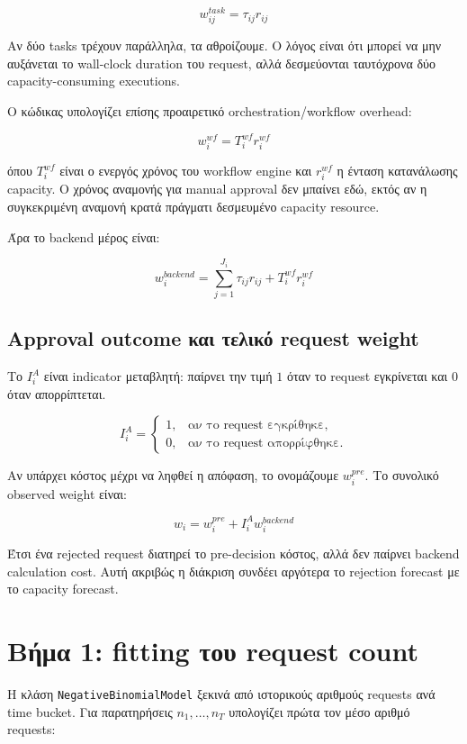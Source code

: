 \documentclass[11pt,a4paper]{article}
\newcommand{\equationnote}[1]{
  \begin{center}
    \colorbox{boxblue}{\parbox{0.92\linewidth}{\begin{equation*}#1\end{equation*}}}
  \end{center}
}
\newcommand{\code}[1]{\texttt{#1}}
\begin{document}
\equationnote{w_{ij}^{task} = \tau_{ij} r_{ij}}

Αν δύο tasks τρέχουν παράλληλα, τα αθροίζουμε. Ο λόγος είναι ότι μπορεί να
μην αυξάνεται το wall-clock duration του request, αλλά δεσμεύονται ταυτόχρονα
δύο capacity-consuming executions.

Ο κώδικας υπολογίζει επίσης προαιρετικό orchestration/workflow overhead:

\equationnote{w_i^{wf} = T_i^{wf} r_i^{wf}}

όπου $T_i^{wf}$ είναι ο ενεργός χρόνος του workflow engine και $r_i^{wf}$ η
ένταση κατανάλωσης capacity. Ο χρόνος αναμονής για manual approval δεν
μπαίνει εδώ, εκτός αν η συγκεκριμένη αναμονή κρατά πράγματι δεσμευμένο
capacity resource.

Άρα το backend μέρος είναι:

\equationnote{
  w_i^{backend} = \sum_{j=1}^{J_i} \tau_{ij}r_{ij} + T_i^{wf}r_i^{wf}
}

\subsection{Approval outcome και τελικό request weight}

Το $I_i^{A}$ είναι indicator μεταβλητή: παίρνει την τιμή $1$ όταν το request
εγκρίνεται και $0$ όταν απορρίπτεται.

\equationnote{
  I_i^{A} =
  \begin{cases}
    1, & \text{αν το request εγκρίθηκε},\\
    0, & \text{αν το request απορρίφθηκε}.
  \end{cases}
}

Αν υπάρχει κόστος μέχρι να ληφθεί η απόφαση, το ονομάζουμε
$w_i^{pre}$. Το συνολικό observed weight είναι:

\equationnote{w_i = w_i^{pre} + I_i^{A}w_i^{backend}}

Έτσι ένα rejected request διατηρεί το pre-decision κόστος, αλλά δεν παίρνει
backend calculation cost. Αυτή ακριβώς η διάκριση συνδέει αργότερα το
rejection forecast με το capacity forecast.

\section{Βήμα 1: fitting του request count}

Η κλάση \code{NegativeBinomialModel} ξεκινά από ιστορικούς αριθμούς requests
ανά time bucket. Για παρατηρήσεις $n_1,\ldots,n_T$ υπολογίζει πρώτα τον μέσο
αριθμό requests:
\end{document}
